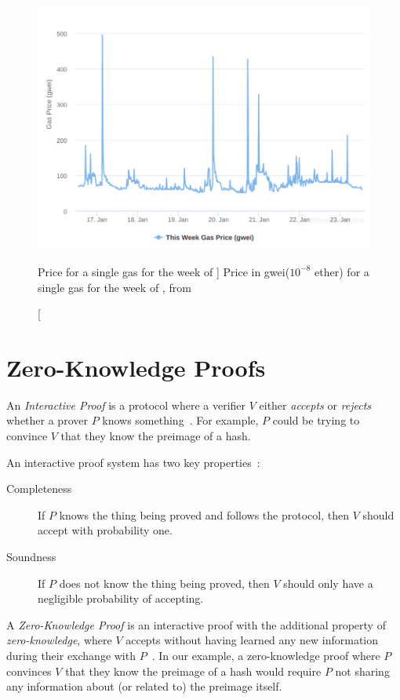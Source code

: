 \begin{figure}[th]
    \centering
    \includegraphics[width=0.9\columnwidth]{figures/ethgasprice}
    \caption
    [Price for a single gas for the week of ]
    {Price in gwei($10^{-8}$ ether) for a single gas for the week of ,
        from~\cite{eth23janGasPrice}}
    \label{fig:eth-gas-price}
\end{figure}


\section{Zero-Knowledge Proofs}\label{sec:zero-knowledge-proofs}

An \textit{Interactive Proof} is a protocol where a verifier $V$ either \textit{accepts} or \textit{rejects} whether a
prover $P$ knows something~\cite{damgaard1998zk_protocols}.
For example, $P$ could be trying to convince $V$ that they know the preimage of a hash.

An interactive proof system has two key properties~\cite{smart2016zeroknowledgeproofs}:
\begin{description}
    \item[Completeness] If $P$ knows the thing being proved and follows the protocol, then $V$ should accept with
    probability one.
    \item[Soundness] If $P$ does not know the thing being proved, then $V$ should only have a negligible probability of
    accepting.
\end{description}

A \textit{Zero-Knowledge Proof} is an interactive proof with the additional property of \textit{zero-knowledge}, where
$V$ accepts without having learned any new information during their exchange with $P$~\cite{damgaard1998zk_protocols,
    smart2016zeroknowledgeproofs}.
In our example, a zero-knowledge proof where $P$ convinces $V$ that they know the preimage of a hash would require $P$
not sharing any information about (or related to) the preimage itself.

